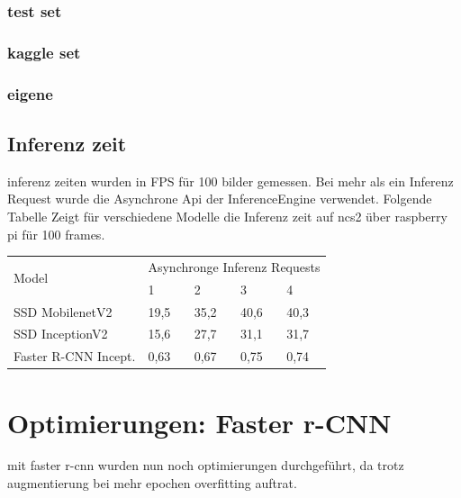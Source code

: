 \subsubsection{test set}
\subsubsection{kaggle set}
\subsubsection{eigene}


\subsection{Inferenz zeit}

inferenz zeiten wurden in FPS für 100 bilder gemessen. Bei 
mehr als ein Inferenz Request wurde die Asynchrone Api der InferenceEngine 
verwendet.
Folgende Tabelle Zeigt für verschiedene Modelle die 
Inferenz zeit auf ncs2 über raspberry pi für 100 frames.



\begin{table}[hpb]
  \centering
  \begin{tabular}{m{}|m{}<{\centering}|m{}<{\centering}|m{}<{\centering}|m{}<{\centering}}
  \hline
  \multirow{2}{*}{Model} & \multicolumn{4}{c}{Asynchronge Inferenz Requests} \\ \cline{2-5} 
                         & 1           & 2          & 3          & 4          \\ \hline\hline
  SSD MobilenetV2        & 19,5           & 35,2          & 40,6          & 40,3          \\
  SSD InceptionV2        & 15,6           & 27,7          & 31,1          & 31,7          \\
  Faster R-CNN Incept.   & 0,63           & 0,67          & 0,75          & 0,74          \\ \hline
  \end{tabular}
\end{table}


\section{Optimierungen: Faster r-CNN}\label{sec:optimierung_faster_rcnn}
mit faster r-cnn wurden nun noch optimierungen durchgeführt, da 
trotz augmentierung bei mehr epochen overfitting auftrat.


